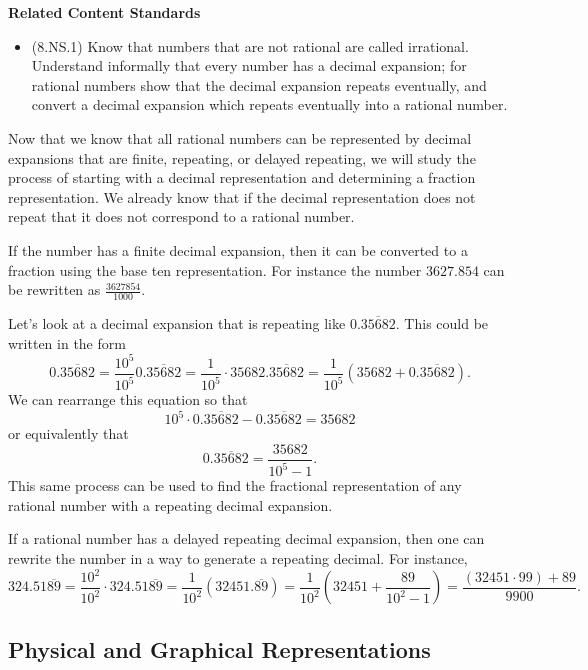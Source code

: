 \documentclass[
]{book}
\providecommand{\tightlist}{%
  \setlength{\itemsep}{0pt}\setlength{\parskip}{0pt}}
\newenvironment{standards}{}{}
\theoremstyle{definition}
\theoremstyle{definition}
\theoremstyle{definition}
\theoremstyle{definition}
\theoremstyle{remark}
\begin{document}
\begin{standards}

\begin{center}
\textbf{Related Content Standards}

\end{center}

\begin{itemize}
\tightlist
\item
  (8.NS.1) Know that numbers that are not rational are called irrational. Understand informally that every number has a decimal expansion; for rational numbers show that the decimal expansion repeats eventually, and convert a decimal expansion which repeats eventually into a rational number.
\end{itemize}

\end{standards}

Now that we know that all rational numbers can be represented by decimal expansions that are finite, repeating, or delayed repeating, we will study the process of starting with a decimal representation and determining a fraction representation. We already know that if the decimal representation does not repeat that it does not correspond to a rational number.

If the number has a finite decimal expansion, then it can be converted to a fraction using the base ten representation. For instance the number \(3627.854\) can be rewritten as \(\frac{3627854}{1000}\).

Let's look at a decimal expansion that is repeating like \(0.\overline{35682}\). This could be written in the form \[0.\overline{35682}= \frac{10^5}{10^5} 0.\overline{35682} = \frac{1}{10^5} \cdot 35682.\overline{35682} = \frac{1}{10^5} \left( 35682 + 0.\overline{35682}\right).\] We can rearrange this equation so that
\[10^5 \cdot 0.\overline{35682} - 0.\overline{35682} = 35682\] or equivalently that
\[0.\overline{35682} = \frac{35682}{10^5-1}.\] This same process can be used to find the fractional representation of any rational number with a repeating decimal expansion.

If a rational number has a delayed repeating decimal expansion, then one can rewrite the number in a way to generate a repeating decimal. For instance,
\[324.51\overline{89} = \frac{10^2}{10^2} \cdot 324.51\overline{89} = \frac{1}{10^2} \left( 32451.\overline{89}\right) = \frac{1}{10^2} \left( 32451+\frac{89}{10^2-1} \right) = \frac{(32451\cdot 99)+89}{9900}.\]

\hypertarget{physical-and-graphical-representations}{%
\subsection{Physical and Graphical Representations}\label{physical-and-graphical-representations}}
\end{document}
